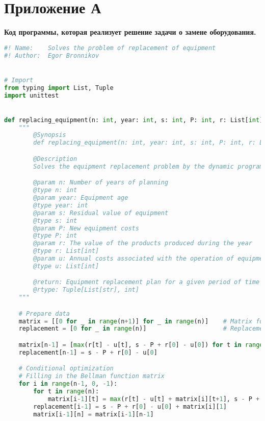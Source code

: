 \section*{Приложение А}

\begin{center}
    \textbf{Код программы, которая реализует решение задачи о замене оборудования.}
\end{center}

\begin{lstlisting}[language=Python]
#! Name:    Solves the problem of replacement of equipment
#! Author:  Egor Bronnikov


# Import
from typing import List, Tuple
import unittest


def replacing_equipment(n: int, year: int, s: int, P: int, r: List[int], u: List[int]) -> Tuple[List[str], int]:
    """
        @Synopsis
        def replacing_equipment(n: int, year: int, s: int, P: int, r: List[int], u: List[int]) -> Tuple[List[str], int]: ...

        @Description
        Solves the equipment replacement problem by the dynamic programming method.

        @param n: Number of years of planning
        @type n: int
        @param year: Equipment age
        @type year: int
        @param s: Residual value of equipment
        @type s: int
        @param P: New equipment costs
        @type P: int
        @param r: The value of the products produced during the year
        @type r: List[int]
        @param u: Annual costs associated with the operation of equipment
        @type u: List[int]

        @return: Equipment replacement plan for a given period of time `n` and the maximum profit (the target function value).
        @rtype: Tuple[List[str], int]
    """

    # Prepare data
    matrix = [[0 for _ in range(n+1)] for _ in range(n)]    # Matrix for Bellman function
    replacement = [0 for _ in range(n)]                     # Replacement rate

    matrix[n-1] = [max(r[t] - u[t], s - P + r[0] - u[0]) for t in range(n+1)]
    replacement[n-1] = s - P + r[0] - u[0]

    # Conditional optimization
    # Filling in the Bellman function matrix
    for i in range(n-1, 0, -1):
        for t in range(n):
            matrix[i-1][t] = max(r[t] - u[t] + matrix[i][t+1], s - P + r[0] - u[0] + matrix[i][1])
        replacement[i-1] = s - P + r[0] - u[0] + matrix[i][1]
        matrix[i-1][n] = matrix[i-1][n-1]


\end{lstlisting}

